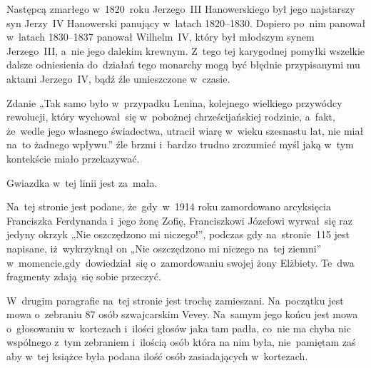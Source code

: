 \documentclass[a4paper,11pt]{article}
\numberwithin{equation}{section}
\begin{document}
\noindent
{} Następcą zmarłego w~1820~roku Jerzego~III Hanowerskiego był jego
najstarszy syn Jerzy~IV Hanowerski panujący w~latach 1820--1830. Dopiero
po~nim panował w~latach 1830--1837 panował Wilhelm~IV, który był młodszym
synem Jerzego~III, a~nie jego dalekim krewnym. Z~tego tej karygodnej
pomyłki wszelkie dalsze odniesienia do~działań tego monarchy mogą być
błędnie przypisanymi mu aktami Jerzego~IV, bądź źle umieszczone w~czasie.

\VerSpaceFour





\noindent
{} Zdanie „Tak samo było w~przypadku Lenina,
kolejnego wielkiego przywódcy rewolucji, który wychował~się w~pobożnej
chrześcijańskiej rodzinie, a~fakt, że~wedle jego własnego świadectwa,
utracił wiarę w~wieku szesnastu lat, nie miał na~to żadnego wpływu.”
źle brzmi i~bardzo trudno zrozumieć myśl jaką w~tym kontekście miało
przekazywać.

\VerSpaceFour





\noindent
{} Gwiazdka w~tej linii jest za~mała.

\VerSpaceFour





\noindent
{} Na~tej stronie jest podane, że~gdy~w~1914 roku zamordowano
arcyksięcia Franciszka Ferdynanda i~jego żonę Zofię, Franciszkowi Józefowi
wyrwał~się raz jedyny okrzyk „Nie oszczędzono mi niczego!”, podczas gdy
na~stronie~115 jest napisane, iż~wykrzyknął on „Nie oszczędzono mi niczego
na~tej ziemni” w~momencie,gdy~dowiedział~się o~zamordowaniu swojej żony
Elżbiety. Te~dwa fragmenty zdają~się sobie przeczyć.

\VerSpaceFour





\noindent
{} W~drugim paragrafie na~tej stronie jest trochę zamieszani.
Na~początku jest mowa o~zebraniu 87 osób szwajcarskim Vevey. Na~samym jego
końcu jest mowa o~głosowaniu w~kortezach i~ilości głosów jaka tam padła,
co~nie ma chyba nic wspólnego z~tym zebraniem i~ilością osób która na nim
była, nie~pamiętam zaś aby w~tej książce była podana ilość osób
zasiadających w~kortezach.

\VerSpaceFour
\end{document}
